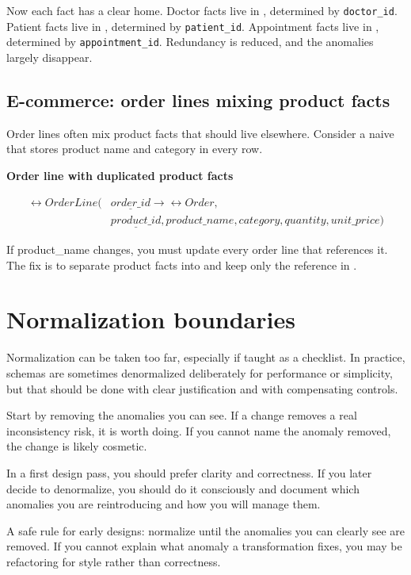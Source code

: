 Now each fact has a clear home.
Doctor facts live in , determined by \texttt{doctor\_id}.
Patient facts live in , determined by \texttt{patient\_id}.
Appointment facts live in , determined by \texttt{appointment\_id}.
Redundancy is reduced, and the anomalies largely disappear.

\subsection{E-commerce: order lines mixing product facts}
Order lines often mix product facts that should live elsewhere.
Consider a naive  that stores product name and category in every row.

\begin{examplebox}
\textbf{Order line with duplicated product facts}\par\smallskip
\[
\begin{aligned}
\rel{OrderLine}(&\underline{order\_id} \rightarrow \rel{Order}, \\
&\underline{product\_id}, product\_name, category, quantity, unit\_price)
\end{aligned}
\]
\end{examplebox}

If product\_name changes, you must update every order line that references it.
The fix is to separate product facts into  and keep only the reference in .

\section{Normalization boundaries}
Normalization can be taken too far, especially if taught as a checklist.
In practice, schemas are sometimes denormalized deliberately for performance or simplicity, but that should be done with clear justification and with compensating controls.

Start by removing the anomalies you can see.
If a change removes a real inconsistency risk, it is worth doing.
If you cannot name the anomaly removed, the change is likely cosmetic.

In a first design pass, you should prefer clarity and correctness.
If you later decide to denormalize, you should do it consciously and document which anomalies you are reintroducing and how you will manage them.

\begin{notebox}
A safe rule for early designs: normalize until the anomalies you can clearly see are removed.
If you cannot explain what anomaly a transformation fixes, you may be refactoring for style rather than correctness.
\end{notebox}

